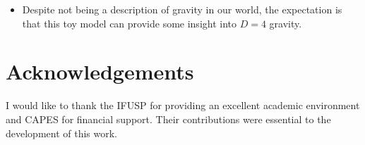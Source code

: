 \documentclass[a0,portrait]{a0poster}
\begin{document}
\begin{multicols}{2}
\begin{itemize}
    \item Despite not being a description of gravity in our world, the expectation is that this toy model can provide some insight into $D=4$ gravity.
\end{itemize}









\section*{Acknowledgements}

I would like to thank the IFUSP for providing an excellent academic environment and CAPES for financial support. Their contributions were essential to the development of this work.

\printbibliography




\end{multicols}
\end{document}
